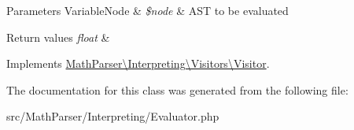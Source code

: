 \begin{DoxyParams}[1]{Parameters}
Variable\-Node & {\em \$node} & A\-S\-T to be evaluated \\
\hline
\end{DoxyParams}

\begin{DoxyRetVals}{Return values}
{\em float} & \\
\hline
\end{DoxyRetVals}


Implements \hyperlink{interfaceMathParser_1_1Interpreting_1_1Visitors_1_1Visitor_a292630a7204dadd96877d8182f38deb0}{Math\-Parser\textbackslash{}\-Interpreting\textbackslash{}\-Visitors\textbackslash{}\-Visitor}.



The documentation for this class was generated from the following file\-:\begin{DoxyCompactItemize}
\item 
src/\-Math\-Parser/\-Interpreting/Evaluator.\-php\end{DoxyCompactItemize}
